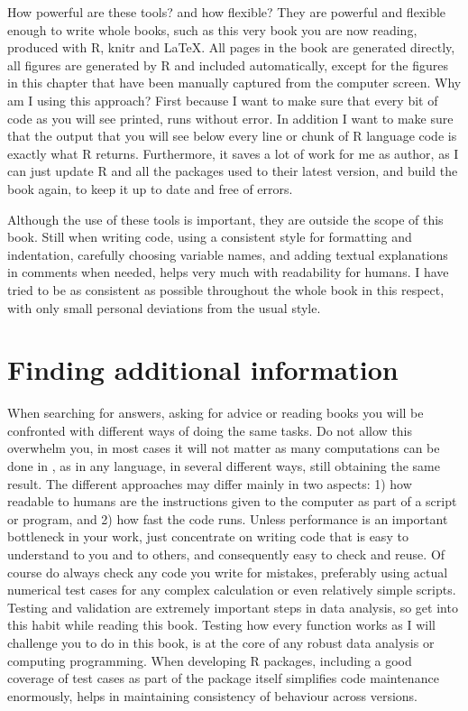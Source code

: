 \documentclass[krantz2,ChapterTOCs]{krantz}\usepackage{knitr}
\begin{document}
How powerful are these tools? and how flexible? They are powerful and flexible enough to write whole books, such as this very book you are now reading, produced with R, knitr and \LaTeX. All pages in the book are generated directly, all figures are generated by R and included automatically, except for the figures in this chapter that have been manually captured from the computer screen. Why am I using this approach? First because I want to make sure that every bit of code as you will see printed, runs without error. In addition I want to make sure that the output that you will see below every line or chunk of R language code is exactly what R returns. Furthermore, it saves a lot of work for me as author, as I can just update R and all the packages used to their latest version, and build the book again, to keep it up to date and free of errors.

Although the use of these tools is important, they are outside the scope of this book. Still when writing code, using a consistent style for formatting and indentation, carefully choosing variable names, and adding textual explanations in comments when needed, helps very much with readability for humans. I have tried to be as consistent as possible throughout the whole book in this respect, with only small personal deviations from the usual style.

\section{Finding additional information}

When searching for answers, asking for advice or reading books you will be confronted with different ways of doing the same tasks. Do not allow this overwhelm you, in most cases it will not matter as many computations can be done in \Rpgrm, as in any language, in several different ways, still obtaining the same result. The different approaches may differ mainly in two aspects: 1) how readable to humans are the instructions given to the computer as part of a script or program, and 2) how fast the code runs. Unless performance is an important bottleneck in your work, just concentrate on writing code that is easy to understand to you and to others, and consequently easy to check and reuse. Of course do always check any code you write for mistakes, preferably using actual numerical test cases for any complex calculation or even relatively simple scripts. Testing and validation are extremely important steps in data analysis, so get into this habit while reading this book. Testing how every function works as I will challenge you to do in this book, is at the core of any robust data analysis or computing programming. When developing R packages, including a good coverage of test cases as part of the package itself simplifies code maintenance enormously, helps in maintaining consistency of behaviour across versions.
\end{document}
